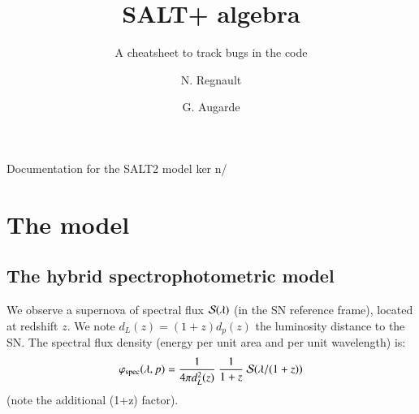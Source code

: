 \documentclass{aa}
\begin{document}
   \title{SALT+ algebra}

   \subtitle{A cheatsheet to track bugs in the code}

   \author{N. Regnault
          \and
          G. Augarde
          }

 
   
   \date{}

 
  \abstract
   {Documentation for the SALT2 model}
   {}
   {}
   {}ker
   n/
   {}

   
   \maketitle
%

\section{The model}


\subsection{The hybrid spectrophotometric model}

We observe a supernova of spectral flux ${\cal S}(\lambda)$ (in the SN
reference frame), located at redshift $z$.  We note $d_L(z) = (1+z)
d_p(z)$ the luminosity distance to the SN.  The spectral flux density
(energy per unit area and per unit wavelength) is:
\begin{equation}
  \varphi_{\mathrm{spec}}(\lambda,p) = \frac{1}{4\pi d_L^2(z)} \ \frac{1}{1+z} \ {\cal S}(\lambda/(1+z))
  \label{eqn:specmodel}  
\end{equation}
(note the additional (1+z) factor).
\end{document}
